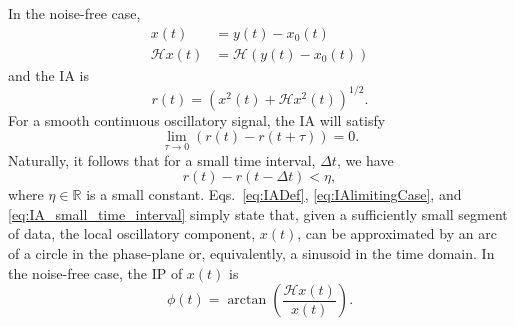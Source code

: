 \documentclass[11pt,draftcls,onecolumn]{IEEEtran}
\begin{document}
In the noise-free case, 
\begin{align}
	x\left( t \right) &= y\left( t \right) - x_0\left( t \right) \\
	\mathcal{H}x\left( t \right) &= \mathcal{H}\left(y\left( t \right) - x_0\left( t \right)\right)
\end{align}
and the IA is
\begin{equation}\label{eq:IADef}
    r\left( t \right) = \left( x^2(t) + \mathcal{H}x^2(t)\right)^{1/2}.
\end{equation}
For a smooth continuous oscillatory signal, the IA will satisfy
\begin{equation}\label{eq:IAlimitingCase}
\mathop {\lim }\limits_{\tau  \to 0} \left( r\left( t \right) - r\left( t + \tau \right) \right) = 0.
\end{equation}
Naturally, it follows that for a small time interval, $\Delta t$, we have
\begin{equation}\label{eq:IA_small_time_interval}
    r(t)-r(t-\Delta t) < \eta,
\end{equation}
where $\eta \in \mathbb{R}$ is a small constant. Eqs.~\ref{eq:IADef}, \ref{eq:IAlimitingCase}, and \ref{eq:IA_small_time_interval} simply state that, given a sufficiently small segment of data, the local oscillatory component, $x(t)$, can be approximated by an arc of a circle in the phase-plane or, equivalently, a sinusoid in the time domain. In the noise-free case, the IP of $x(t)$ is
\begin{equation}\label{IPdef}
    \phi \left( t \right) = \arctan \left( \frac{\mathcal{H}x\left( t \right)}
    {x\left( t \right)} \right).
\end{equation}
\end{document}
